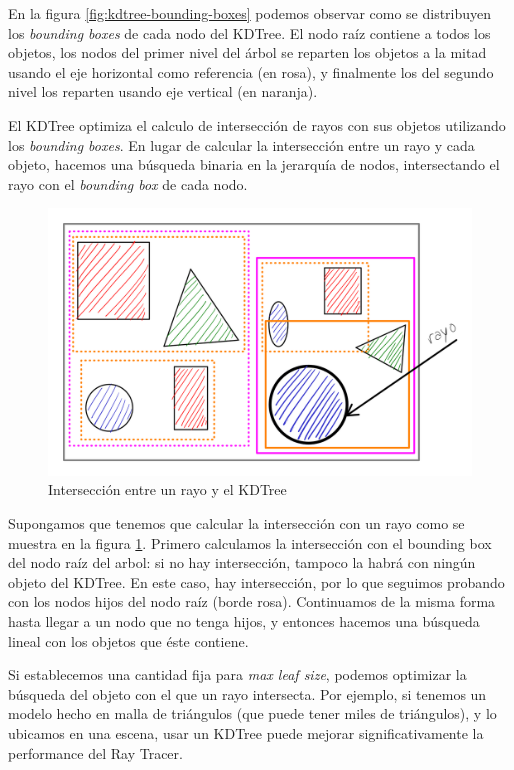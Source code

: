 En la figura \ref{fig:kdtree-bounding-boxes} podemos observar como se
distribuyen los \textit{bounding boxes} de cada nodo del KDTree. El nodo raíz
contiene a todos los objetos, los nodos del primer nivel del árbol se
reparten los objetos a la mitad usando el eje horizontal como referencia (en
rosa), y finalmente los del segundo nivel los reparten usando eje vertical (en
naranja).

El KDTree optimiza el calculo de intersección de rayos con sus objetos
utilizando los \textit{bounding boxes}. En lugar de calcular la intersección
entre un rayo y cada objeto, hacemos una búsqueda binaria en la jerarquía de
nodos, intersectando el rayo con el \textit{bounding box} de cada nodo.

\begin{figure}[H]
    \centering
    \includegraphics[width=\textwidth]{imgs/kdtree-ray-intersection.png}
    \caption{Intersección entre un rayo y el KDTree}
    \label{fig:kdtree-ray-intersection}
\end{figure}

Supongamos que tenemos que calcular la intersección con un rayo como se muestra
en la figura \ref{fig:kdtree-ray-intersection}. Primero calculamos la
intersección con el bounding box del nodo raíz del arbol: si no hay
intersección, tampoco la habrá con ningún objeto del KDTree. En este caso, hay
intersección, por lo que seguimos probando con los nodos hijos del nodo raíz
(borde rosa). Continuamos de la misma forma hasta llegar a un nodo que no tenga
hijos, y entonces hacemos una búsqueda lineal con los objetos que éste contiene.

Si establecemos una cantidad fija para \textit{max leaf size}, podemos optimizar
la búsqueda del objeto con el que un rayo intersecta. Por ejemplo, si tenemos un
modelo hecho en malla de triángulos (que puede tener miles de triángulos), y lo
ubicamos en una escena, usar un KDTree puede mejorar significativamente la
performance del Ray Tracer.

